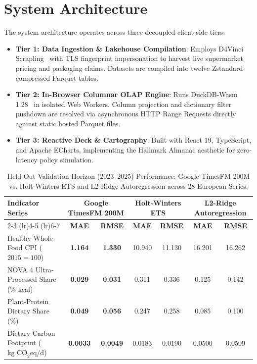 \documentclass[journal,10pt,twocolumn]{article}
\begin{document}
\section{System Architecture}
The system architecture operates across three decoupled client-side tiers:
\begin{itemize}
    \item \textbf{Tier 1: Data Ingestion \& Lakehouse Compilation}: Employs D4Vinci Scrapling~\cite{scrapling2024} with TLS fingerprint impersonation to harvest live supermarket pricing and packaging claims. Datasets are compiled into twelve Zstandard-compressed Parquet tables.
    \item \textbf{Tier 2: In-Browser Columnar OLAP Engine}: Runs DuckDB-Wasm 1.28~\cite{raasveldt2024wasm} in isolated Web Workers. Column projection and dictionary filter pushdown are resolved via asynchronous HTTP Range Requests directly against static hosted Parquet files.
    \item \textbf{Tier 3: Reactive Deck \& Cartography}: Built with React 19, TypeScript, and Apache ECharts, implementing the Hallmark Almanac aesthetic for zero-latency policy simulation.
\end{itemize}

\begin{table}[t]
\centering
\caption{Held-Out Validation Horizon (2023--2025) Performance: Google TimesFM 200M vs. Holt-Winters ETS and L2-Ridge Autoregression across 28 European Series.}
\label{tab:timesfm}
\small
\begin{tabular}{lcccccc}
\toprule
\textbf{Indicator Series} & \multicolumn{2}{c}{\textbf{Google TimesFM 200M}} & \multicolumn{2}{c}{\textbf{Holt-Winters ETS}} & \multicolumn{2}{c}{\textbf{L2-Ridge Autoregression}} \\
\cmidrule(lr){2-3} \cmidrule(lr){4-5} \cmidrule(lr){6-7}
& \textbf{MAE} & \textbf{RMSE} & \textbf{MAE} & \textbf{RMSE} & \textbf{MAE} & \textbf{RMSE} \\
\midrule
Healthy Whole-Food CPI ($2015=100$) & \textbf{1.164} & \textbf{1.330} & 10.940 & 11.130 & 16.201 & 16.262 \\
NOVA 4 Ultra-Processed Share (\% kcal) & \textbf{0.029} & \textbf{0.031} & 0.311 & 0.336 & 0.125 & 0.142 \\
Plant-Protein Dietary Share (\%) & \textbf{0.049} & \textbf{0.056} & 0.247 & 0.258 & 0.085 & 0.100 \\
Dietary Carbon Footprint ($\text{kg CO}_2\text{eq}/\text{d}$) & \textbf{0.0033} & \textbf{0.0049} & 0.0183 & 0.0190 & 0.0500 & 0.0509 \\
\bottomrule
\end{tabular}
\end{table}
\end{document}
